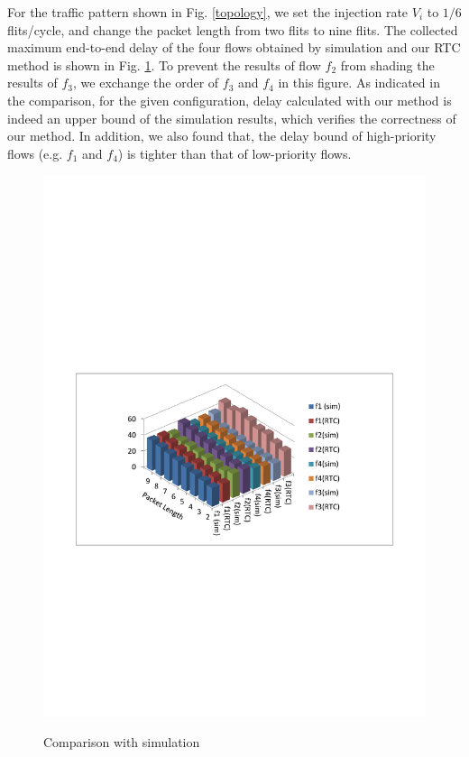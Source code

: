 \documentclass[preprint]{elsarticle}
\begin{document}
For the traffic pattern shown in Fig. \ref{topology}, we set the injection rate $V_i$ to $1/6$ flits/cycle, and change the packet length from two flits to nine flits. The collected maximum end-to-end delay of the four flows obtained by simulation and our RTC method is shown in Fig. \ref{rtcvssim}. To prevent the results of flow $f_2$ from shading the results of $f_3$, we exchange the order of $f_3$ and $f_4$ in this figure. As indicated in the comparison, for the given configuration, delay calculated with our method is indeed an upper bound of the simulation results, which verifies the correctness of our method. In addition, we also found that, the delay bound of high-priority flows (e.g. $f_1$ and $f_4$) is tighter than that of low-priority flows.
\begin{figure}
  \centering
  \includegraphics[scale=0.8]{figures/rtcvssim.pdf}\\
  \caption{Comparison with simulation}\label{rtcvssim}
\end{figure}
\end{document}
